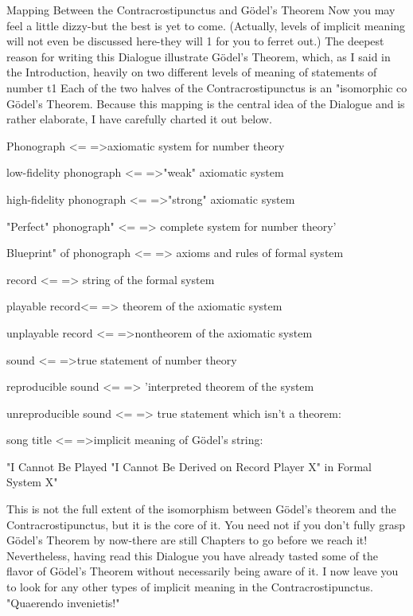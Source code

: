Mapping Between the Contracrostipunctus and Gödel’s Theorem Now you may feel a little dizzy-but the best is yet to come. (Actually, levels of implicit meaning will not even be discussed here-they will 1 for you to ferret out.) The deepest reason for writing this Dialogue illustrate Gödel’s Theorem, which, as I said in the Introduction, heavily on two different levels of meaning of statements of number t1 Each of the two halves of the Contracrostipunctus is an "isomorphic co Gödel’s Theorem. Because this mapping is the central idea of the Dialogue and is rather elaborate, I have carefully charted it out below. 

Phonograph <= =>axiomatic system for number theory 

low-fidelity phonograph <= =>"weak" axiomatic system 

high-fidelity phonograph <= =>"strong" axiomatic system 

"Perfect" phonograph" <= => complete system for number theory' 

Blueprint" of phonograph <= => axioms and rules of formal system 

record <= => string of the formal system 

playable record<= => theorem of the axiomatic system 

unplayable record <= =>nontheorem of the axiomatic system 

sound <= =>true statement of number theory 

reproducible sound <= => 'interpreted theorem of the system 

unreproducible sound <= => true statement which isn't a theorem: 

song title <= =>implicit meaning of Gödel’s string: 

"I Cannot Be Played            "I Cannot Be Derived on Record Player X"            in Formal System X" 

This is not the full extent of the isomorphism between Gödel’s theorem and the Contracrostipunctus, but it is the core of it. You need not if you don't fully grasp Gödel’s Theorem by now-there are still Chapters to go before we reach it! Nevertheless, having read this Dialogue you have already tasted some of the flavor of Gödel’s Theorem without necessarily being aware of it. I now leave you to look for any other types of implicit meaning in the Contracrostipunctus. "Quaerendo invenietis!" 



